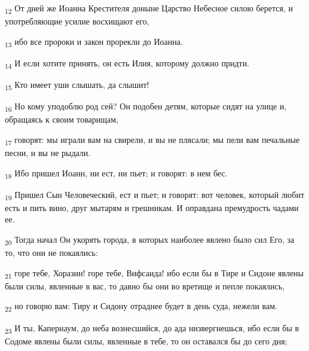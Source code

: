 \begin{tcolorbox}
\textsubscript{12} От дней же Иоанна Крестителя доныне Царство Небесное силою берется, и употребляющие усилие восхищают его,
\end{tcolorbox}
\begin{tcolorbox}
\textsubscript{13} ибо все пророки и закон прорекли до Иоанна.
\end{tcolorbox}
\begin{tcolorbox}
\textsubscript{14} И если хотите принять, он есть Илия, которому должно придти.
\end{tcolorbox}
\begin{tcolorbox}
\textsubscript{15} Кто имеет уши слышать, да слышит!
\end{tcolorbox}
\begin{tcolorbox}
\textsubscript{16} Но кому уподоблю род сей? Он подобен детям, которые сидят на улице и, обращаясь к своим товарищам,
\end{tcolorbox}
\begin{tcolorbox}
\textsubscript{17} говорят: мы играли вам на свирели, и вы не плясали; мы пели вам печальные песни, и вы не рыдали.
\end{tcolorbox}
\begin{tcolorbox}
\textsubscript{18} Ибо пришел Иоанн, ни ест, ни пьет; и говорят: в нем бес.
\end{tcolorbox}
\begin{tcolorbox}
\textsubscript{19} Пришел Сын Человеческий, ест и пьет; и говорят: вот человек, который любит есть и пить вино, друг мытарям и грешникам. И оправдана премудрость чадами ее.
\end{tcolorbox}
\begin{tcolorbox}
\textsubscript{20} Тогда начал Он укорять города, в которых наиболее явлено было сил Его, за то, что они не покаялись:
\end{tcolorbox}
\begin{tcolorbox}
\textsubscript{21} горе тебе, Хоразин! горе тебе, Вифсаида! ибо если бы в Тире и Сидоне явлены были силы, явленные в вас, то давно бы они во вретище и пепле покаялись,
\end{tcolorbox}
\begin{tcolorbox}
\textsubscript{22} но говорю вам: Тиру и Сидону отраднее будет в день суда, нежели вам.
\end{tcolorbox}
\begin{tcolorbox}
\textsubscript{23} И ты, Капернаум, до неба вознесшийся, до ада низвергнешься, ибо если бы в Содоме явлены были силы, явленные в тебе, то он оставался бы до сего дня;
\end{tcolorbox}
